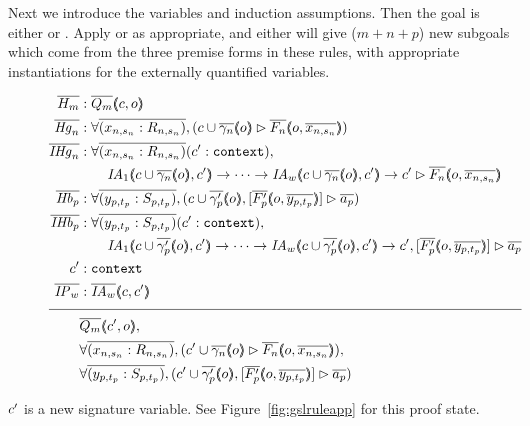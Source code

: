 Next we introduce the variables and induction assumptions. Then the goal is either  or . Apply  or  as appropriate, and either will give ($m + n + p$) new subgoals which come from the three premise forms in these rules, with appropriate instantiations for the externally quantified variables.
\begin{figure}
\begin{align*}
\ol{H_m} &: \ol{Q_m} \args{c , o} \\
\ol{\mathit{Hg}_n} &: \forall \ol{(x_{n,s_n} : R_{n,s_n})}, (\seqsl[c \cup \ol{\gamma_n} \args{o}]{\ol{F_n} \args{o , \ol{x_{n,s_n}}})} \\
\ol{\mathit{IHg}_n} &: \forall \ol{(x_{n,s_n} : R_{n,s_n})} (\inddyncon{} : \sltm{context}), \\
& \qquad \mathit{IA}_1 \args{c \cup \ol{\gamma_n} \args{o} , \inddyncon{}} \rightarrow \dots \rightarrow \mathit{IA}_w \args{c \cup \ol{\gamma_n} \args{o} , \inddyncon{}} \rightarrow \seqsl[\inddyncon{}]{\ol{F_n} \args{o , \ol{x_{n,s_n}}}} \\
\ol{\mathit{Hb}_p} &: \forall \ol{(y_{p,t_p} : S_{p,t_p})}, (\bchsl[c \cup \ol{\gamma'_p} \args{o}]{\ol{F'_p} \args{o , \ol{y_{p,t_p}}}}{\ol{a_p}}) \\
\ol{\mathit{IHb}_p} &: \forall \ol{(y_{p,t_p} : S_{p,t_p})} (\inddyncon{} : \sltm{context}), \\
& \qquad \mathit{IA}_1 \args{c \cup \ol{\gamma'_p} \args{o} , \inddyncon{}} \rightarrow \dots \rightarrow \mathit{IA}_w \args{c \cup \ol{\gamma'_p} \args{o} , \inddyncon{}} \rightarrow \bchsl[\inddyncon{}]{\ol{F'_p} \args{o , \ol{y_{p,t_p}}}}{\ol{a_p}} \\
\inddyncon{} &: \sltm{context} \\
\ol{\mathit{IP}_w} &: \ol{\mathit{IA}_w} \args{c , \inddyncon{}} \\[\pfshift{}]
\cline{1-2}
& \ol{Q_m} \args{\inddyncon{} , o}, \\
& \forall \ol{(x_{n,s_n} : R_{n,s_n})}, (\seqsl[\inddyncon{} \cup \ol{\gamma_n} \args{o}]{\ol{F_n} \args{o , \ol{x_{n,s_n}}}}), \\
& \forall \ol{(y_{p,t_p} : S_{p,t_p})}, (\bchsl[\inddyncon{} \cup \ol{\gamma'_p} \args{o}]{\ol{F'_p} \args{o , \ol{y_{p,t_p}}}}{\ol{a_p}})
\end{align*}
\end{figure}
$c'{}$ is a new signature variable. See Figure~\ref{fig:gslruleapp} for this proof state.

